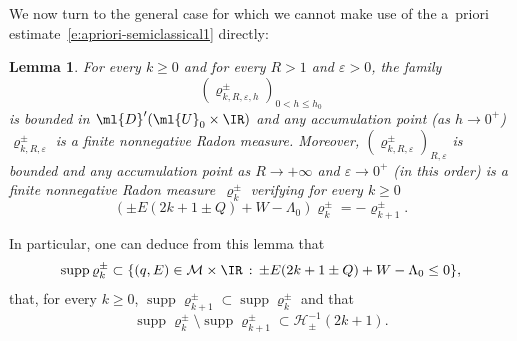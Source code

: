 \documentclass[JEP,XML,SOM,Unicode, NoEqCountersInSection,published]{cedram}
\theoremstyle{plain}
\newtheorem{lemm}[theo]{Lemma}
\theoremstyle{definition}
\theoremstyle{remark}
\begin{document}
We now turn to the general case for which we cannot make use of the a~priori estimate~\eqref{e:apriori-semiclassical1} directly:

\begin{lemm}
\label{l:k_step_support} For every $ k \geq 0$ and for every $R>1$ and $\varepsilon>0$, the family
\[
(\varrho_{k,R,\varepsilon,h}^\pm)_{0<h\leq h_0}
\]
is bounded in $\ml{D}'(\ml{U}_0\times\IR)$ and any accumulation point (as $h\to 0^+$) $\varrho_{k,R,\varepsilon}^\pm$ is a finite nonnegative Radon measure. Moreover, $(\varrho_{k,R,\varepsilon}^\pm)_{R,\varepsilon}$ is bounded and any accumulation point as $R\to+\infty$ and $\varepsilon\to 0^+$ (in this order) is a finite nonnegative Radon measure~$\varrho_{k}^\pm$ verifying for every $k\geq 0$
\[
(\pm E(2k+1 \pm Q)+W-\Lambda_0)\varrho_{k}^{\pm}= - \varrho^\pm_{k+1}.
\]
\end{lemm}

In particular, one can deduce from this lemma that
\[
\operatorname{supp} \varrho_{k}^\pm \subset \{ (q,E) \in \mathcal{M} \times \IR \, : \, \pm E (2k +1 \pm Q) + W - \Lambda_0 \leq 0 \},
\]
that, for every $k\geq 0$, $\operatorname{supp} \varrho_{k+1}^{\pm}\subset\operatorname{supp} \varrho_{k}^{\pm}$ and that
\[
\operatorname{supp} \varrho_{k}^{\pm}\setminus \operatorname{supp} \varrho_{k+1}^\pm \subset \mathcal{H}_\pm^{-1}(2k+1) .
\]
\end{document}
